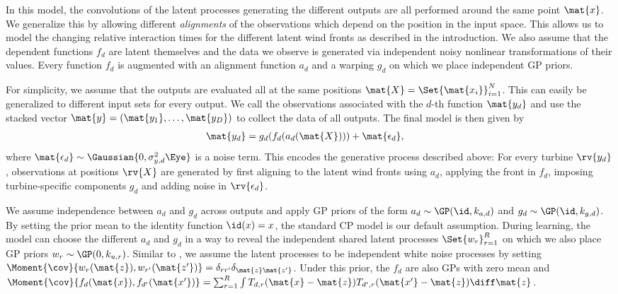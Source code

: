 \documentclass{article}
\begin{document}
In this model, the convolutions of the latent processes generating the different outputs are all performed around the same point $\mat{x}$.
We generalize this by allowing different \emph{alignments} of the observations which depend on the position in the input space.
This allows us to model the changing relative interaction times for the different latent wind fronts as described in the introduction.
We also assume that the dependent functions $f_d$ are latent themselves and the data we observe is generated via independent noisy nonlinear transformations of their values.
Every function $f_d$ is augmented with an alignment function $a_d$ and a warping $g_d$ on which we place independent GP priors.

For simplicity, we assume that the outputs are evaluated all at the same positions $\mat{X} = \Set{\mat{x_i}}_{i=1}^N$.
This can easily be generalized to different input sets for every output.
We call the observations associated with the $d$-th function $\mat{y_d}$ and use the stacked vector $\mat{y} = \left( \mat{y_1}, \dots, \mat{y_D} \right)$ to collect the data of all outputs.
The final model is then given by
\begin{align}
    \mat{y_d} &= g_d(f_d(a_d(\mat{X}))) + \mat{\epsilon_d},
\end{align}
where $\mat{\epsilon_d} \sim \Gaussian{0, \sigma_{y, d}^2\Eye}$ is a noise term.
This encodes the generative process described above:
For every turbine $\rv{y_d}$, observations at positions $\rv{X}$ are generated by first aligning to the latent wind fronts using $a_d$, applying the front in $f_d$, imposing turbine-specific components $g_d$ and adding noise in $\rv{\epsilon_d}$.

We assume independence between $a_d$ and $g_d$ across outputs and apply GP priors of the form $a_d \sim \GP(\id, k_{a, d})$ and $g_d \sim \GP(\id, k_{g, d})$.
By setting the prior mean to the identity function $\id(x) = x$, the standard CP model is our default assumption.
During learning, the model can choose the different $a_d$ and $g_d$ in a way to reveal the independent shared latent processes $\Set{w_r}_{r=1}^R$ on which we also place GP priors $w_r \sim \GP(0, k_{u, r})$.
Similar to \textcite{boyle_dependent_2004}, we assume the latent processes to be independent white noise processes by setting $\Moment{\cov}{w_r(\mat{z}), w_{r^\prime}(\mat{z^\prime})} = \delta_{rr^\prime}\delta_{\mat{z}\mat{z^\prime}}$.
Under this prior, the $f_d$ are also GPs with zero mean and $\Moment{\cov}{f_d(\mat{x}), f_{d^\prime}(\mat{x^\prime})} = \sum_{r=1}^R \int T_{d,r}(\mat{x} - \mat{z}) T_{d^\prime,r}(\mat{x^\prime} - \mat{z}) \diff \mat{z}$.
\end{document}
